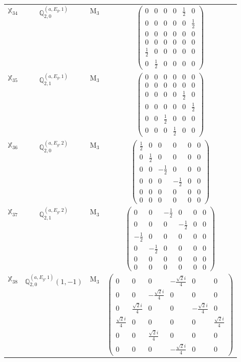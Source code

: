 \documentclass[fleqn,10pt,landscape]{article}
\begin{document}
\begin{itemize}
\begin{center}
\begin{longtable}{c|c|c|c}
$ \mathbb{X}_{34} $ & $\mathbb{Q}_{2,0}^{(a,E_{g},1)}$ & M$_{3}$ & $\begin{pmatrix} 0 & 0 & 0 & 0 & \frac{1}{2} & 0 \\ 0 & 0 & 0 & 0 & 0 & \frac{1}{2} \\ 0 & 0 & 0 & 0 & 0 & 0 \\ 0 & 0 & 0 & 0 & 0 & 0 \\ \frac{1}{2} & 0 & 0 & 0 & 0 & 0 \\ 0 & \frac{1}{2} & 0 & 0 & 0 & 0 \end{pmatrix}$ \\
$ \mathbb{X}_{35} $ & $\mathbb{Q}_{2,1}^{(a,E_{g},1)}$ & M$_{3}$ & $\begin{pmatrix} 0 & 0 & 0 & 0 & 0 & 0 \\ 0 & 0 & 0 & 0 & 0 & 0 \\ 0 & 0 & 0 & 0 & \frac{1}{2} & 0 \\ 0 & 0 & 0 & 0 & 0 & \frac{1}{2} \\ 0 & 0 & \frac{1}{2} & 0 & 0 & 0 \\ 0 & 0 & 0 & \frac{1}{2} & 0 & 0 \end{pmatrix}$ \\
$ \mathbb{X}_{36} $ & $\mathbb{Q}_{2,0}^{(a,E_{g},2)}$ & M$_{3}$ & $\begin{pmatrix} \frac{1}{2} & 0 & 0 & 0 & 0 & 0 \\ 0 & \frac{1}{2} & 0 & 0 & 0 & 0 \\ 0 & 0 & - \frac{1}{2} & 0 & 0 & 0 \\ 0 & 0 & 0 & - \frac{1}{2} & 0 & 0 \\ 0 & 0 & 0 & 0 & 0 & 0 \\ 0 & 0 & 0 & 0 & 0 & 0 \end{pmatrix}$ \\
$ \mathbb{X}_{37} $ & $\mathbb{Q}_{2,1}^{(a,E_{g},2)}$ & M$_{3}$ & $\begin{pmatrix} 0 & 0 & - \frac{1}{2} & 0 & 0 & 0 \\ 0 & 0 & 0 & - \frac{1}{2} & 0 & 0 \\ - \frac{1}{2} & 0 & 0 & 0 & 0 & 0 \\ 0 & - \frac{1}{2} & 0 & 0 & 0 & 0 \\ 0 & 0 & 0 & 0 & 0 & 0 \\ 0 & 0 & 0 & 0 & 0 & 0 \end{pmatrix}$ \\
$ \mathbb{X}_{38} $ & $\mathbb{Q}_{2,0}^{(a,E_{g},1)}(1,-1)$ & M$_{3}$ & $\begin{pmatrix} 0 & 0 & 0 & - \frac{\sqrt{2} i}{4} & 0 & 0 \\ 0 & 0 & - \frac{\sqrt{2} i}{4} & 0 & 0 & 0 \\ 0 & \frac{\sqrt{2} i}{4} & 0 & 0 & - \frac{\sqrt{2} i}{4} & 0 \\ \frac{\sqrt{2} i}{4} & 0 & 0 & 0 & 0 & \frac{\sqrt{2} i}{4} \\ 0 & 0 & \frac{\sqrt{2} i}{4} & 0 & 0 & 0 \\ 0 & 0 & 0 & - \frac{\sqrt{2} i}{4} & 0 & 0 \end{pmatrix}$ \\

\end{longtable}
\end{center}
\end{itemize}
\end{document}
